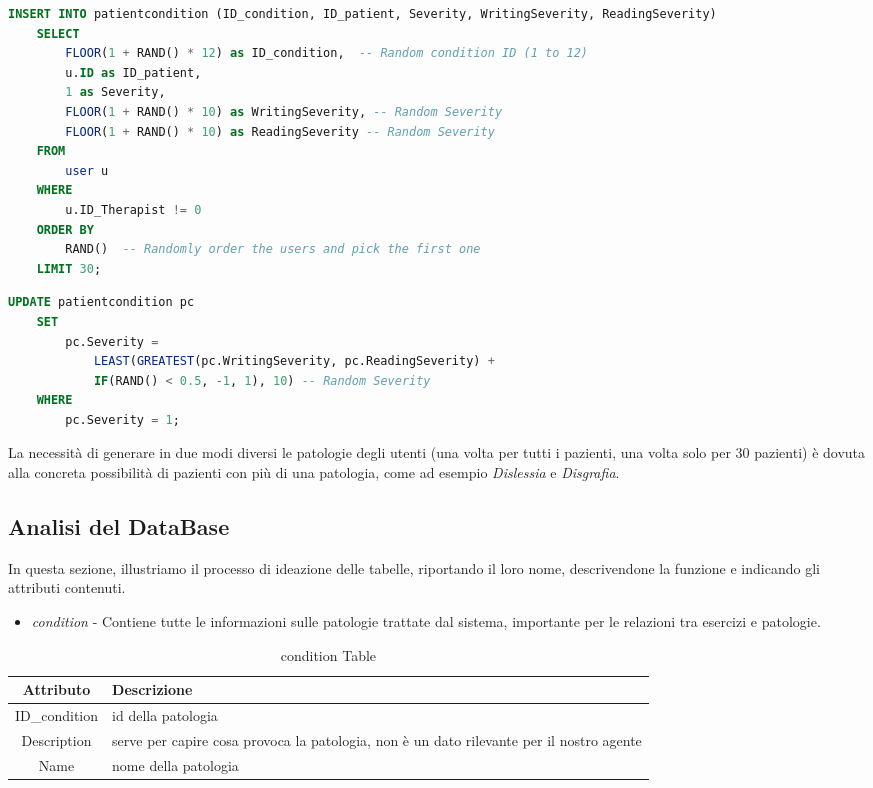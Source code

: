 \documentclass{article}
\begin{document}
    \begin{lstlisting}[language=SQL, caption=Generazione delle Writing e Reading severity (solo per 30 pazienti)]
    INSERT INTO patientcondition (ID_condition, ID_patient, Severity, WritingSeverity, ReadingSeverity)
    SELECT
        FLOOR(1 + RAND() * 12) as ID_condition,  -- Random condition ID (1 to 12)
        u.ID as ID_patient,
        1 as Severity,
        FLOOR(1 + RAND() * 10) as WritingSeverity, -- Random Severity
        FLOOR(1 + RAND() * 10) as ReadingSeverity -- Random Severity
    FROM
        user u
    WHERE
        u.ID_Therapist != 0
    ORDER BY
        RAND()  -- Randomly order the users and pick the first one
    LIMIT 30;
    \end{lstlisting}

    \begin{lstlisting}[language=SQL, caption=Generazione della General severity (tutti i pazienti)]
    UPDATE patientcondition pc
    SET
        pc.Severity = 
            LEAST(GREATEST(pc.WritingSeverity, pc.ReadingSeverity) + 
            IF(RAND() < 0.5, -1, 1), 10) -- Random Severity
    WHERE
        pc.Severity = 1;
    \end{lstlisting}

    La necessità di generare in due modi diversi le patologie degli utenti (una volta per tutti i pazienti, una volta solo per 30 pazienti) è dovuta alla concreta possibilità di pazienti con più di una patologia, come ad esempio \textit{Dislessia} e \textit{Disgrafia}.

    \pagebreak

    \subsection{Analisi del DataBase}
    In questa sezione, illustriamo il processo di ideazione delle tabelle, riportando il loro nome, descrivendone la funzione e indicando gli attributi contenuti.

\begin{itemize}
\item     \textit{condition} - Contiene tutte le informazioni sulle patologie trattate dal sistema, importante per le relazioni tra esercizi e patologie.
\end{itemize}

    \begin{table}[h]
        \centering
        \caption{condition Table}
        \begin{tabular}{|c|p{8cm}|}
            \hline
                \textbf{Attributo} & \textbf{Descrizione} \\
            \hline
                ID\_condition & id della patologia\\
            \hline
                Description & serve per capire cosa provoca la patologia, non è un dato rilevante per il nostro agente\\
            \hline
                Name & nome della patologia\\
            \hline
        \end{tabular}
    \end{table}
\end{document}
